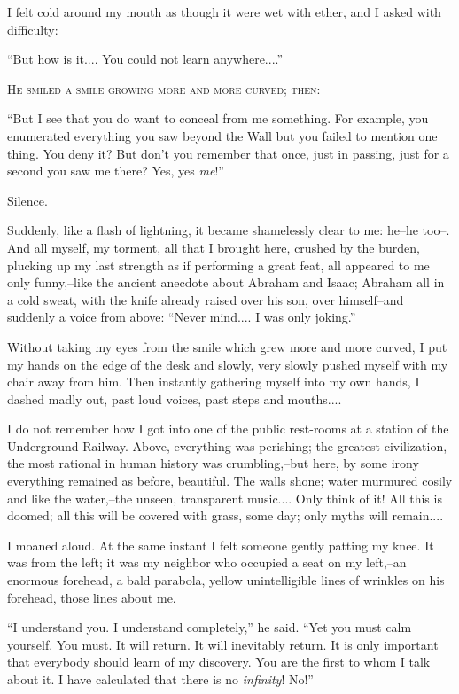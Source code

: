 \documentclass[11pt,openany]{book}
\begin{document}
I felt cold around my mouth as though it were wet with ether, and I asked with difficulty:

``But how is it.... You could not learn anywhere....''

\begin{center}\textsc{He smiled a smile growing more and more curved; then:}\end{center}

``But I see that you do want to conceal from me something. For example, you enumerated everything you saw beyond the Wall but you failed to mention one thing. You deny it? But don't you remember that once, just in passing, just for a second you saw me there? Yes, yes \emph{me}!''

Silence.

Suddenly, like a flash of lightning, it became shamelessly clear to me: he--he too--. And all myself, my torment, all that I brought here, crushed by the burden, plucking up my last strength as if performing a great feat, all appeared to me only funny,--like the ancient anecdote about Abraham and Isaac; Abraham all in a cold sweat, with the knife already raised over his son, over himself--and suddenly a voice from above: ``Never mind.... I was only joking.''

Without taking my eyes from the smile which grew more and more curved, I put my hands on the edge of the desk and slowly, very slowly pushed myself with my chair away from him. Then instantly gathering myself into my own hands, I dashed madly out, past loud voices, past steps and mouths....

I do not remember how I got into one of the public rest-rooms at a station of the Underground Railway. Above, everything was perishing; the greatest civilization, the most rational in human history was crumbling,--but here, by some irony everything remained as before, beautiful. The walls shone; water murmured cosily and like the water,--the unseen, transparent music.... Only think of it! All this is doomed; all this will be covered with grass, some day; only myths will remain....

I moaned aloud. At the same instant I felt someone gently patting my knee. It was from the left; it was my neighbor who occupied a seat on my left,--an enormous forehead, a bald parabola, yellow unintelligible lines of wrinkles on his forehead, those lines about me.

``I understand you. I understand completely,'' he said. ``Yet you must calm yourself. You must. It will return. It will inevitably return. It is only important that everybody should learn of my discovery. You are the first to whom I talk about it. I have calculated that there is no \emph{infinity}! No!''
\end{document}
